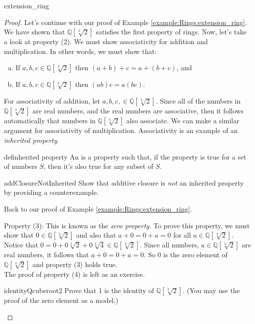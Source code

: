 \begin{example}{extension_ring}
\begin{proof}
Let's continue with our proof of Example \ref{example:Rings:extension_ring}. We have shown that ${\mathbb Q}[\sqrt[3]{2}]$ satisfies the first property of rings. Now, let's take a look at property (2). We must show associativity for addition and multiplication. In other words, we must show that:
\begin{enumerate}[(a)]
\item If $a,b,c\in{\mathbb Q}[\sqrt[3]{2}]$ then $(a+b)+c=a+(b+c)$, and
\item If $a,b,c\in{\mathbb Q}[\sqrt[3]{2}]$ then $(ab)c=a(bc)$.
\end{enumerate}

For associativity of addition, let $a,b,c,\in{\mathbb Q}[ \sqrt[3]{2}]$. Since all of the numbers in ${\mathbb Q}[\sqrt[3]{2}]$ are real numbers, and the real numbers are associative, then it follows automatically that numbers in ${\mathbb Q}[\sqrt[3]{2}]$ also associate.  We can make a similar argument for associativity of multiplication.  Associativity is an example of an \emph{inherited property}.

\begin{defn}{definherited property}
An  is a property such that, if the property is true for a set of numbers $S$, then it's also true for any subset of $S$.
\end{defn}

\begin{exercise}{addClosureNotInherited}
Show that additive closure is \emph{not} an inherited property by providing a counterexample.
\end{exercise}{}

Back to our proof of Example \ref{example:Rings:extension_ring}.

Property (3): This is known as the \emph{zero property}. To prove this property, we must show that $0\in{\mathbb Q}[\sqrt[3]{2}]$ and also that $a+0=0+a=0$ for all $a\in{\mathbb Q}[\sqrt[3]{2}]$. Notice that $0=0+0\sqrt[3]{2}+0\sqrt[3]{4}\in{\mathbb Q}[\sqrt[3]{2}]$. Since all numbers, $a\in{\mathbb Q}[\sqrt[3]{2}]$ are real numbers, it follows that $a+0=0+a=0$. So $0$ is the zero element of ${\mathbb Q}[\sqrt[3]{2}]$ and property (3) holds true.\\

The proof of property (4) is left as an exercise.

\begin{exercise}{identityQcuberoot2}
Prove that 1 is the identity of ${\mathbb Q}[\sqrt[3]{2}]$. (You may use the proof of the zero element as a model.)  
\end{exercise}{}


\end{proof}
\end{example}
